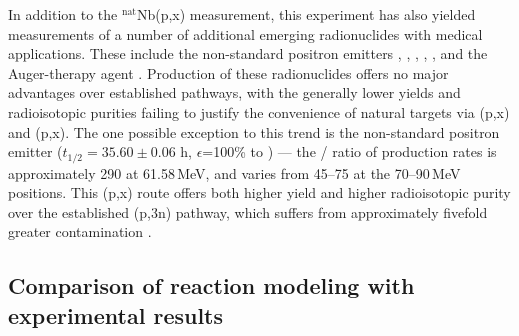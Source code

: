 In addition to the $^\text{nat}$Nb(p,x) measurement, this experiment has also yielded measurements of  a number of additional  emerging radionuclides with medical applications.
These include the non-standard positron emitters 
 \cite{PMID:7632762,zweit1996medium,Graves2016,Rosch2014}, 
 \cite{Lewis2003,Bandari2014,mp500671j,Szelecsenyi1993,Aslam2009,Hilgers2003,Szelecsenyi2005,Voyles2017},   \cite{Valdovinos2017,Nickles2003,Qaim2008,QaimSyedM2011,Rosch1993,doi:10.1139/v67-193,levkovski1991cross,Johnson2015,Singh2013,Kiselev1974,Kandil2009}, 
  \cite{Verel2003,Dijkers2009,Dijkers2010,PhysRevC.38.1624,Omara2009},  
 \cite{Busse2002,Radchenko2012},  
and the Auger-therapy agent  \cite{Kovacs1991,Titarenko2011}. 
Production of these radionuclides offers no major advantages over established pathways, with the generally lower yields and radioisotopic purities failing to justify the convenience of natural targets  via   (p,x) and  (p,x). 
The one possible exception to this trend is the non-standard positron emitter  ($t_{1/2}=35.60\pm0.06$ h, $\epsilon$=100\% to  \cite{Bhat1998}) --- the / ratio of production rates is approximately 290 at 61.58\,MeV, and varies from 45--75 at the 70--90\,MeV positions.
This (p,x) route offers both higher yield and higher radioisotopic purity over the established  (p,3n) pathway, which suffers from approximately fivefold greater   contamination \cite{MICHEL1997153,Ditrói2013}.




\subsection{Comparison of reaction modeling with experimental results}



